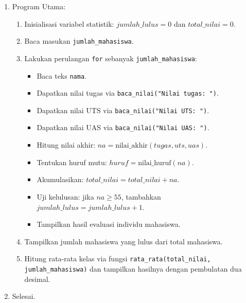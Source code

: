 \documentclass[12pt,a4paper]{article}
\begin{document}
\begin{enumerate}
\begin{enumerate}[label=\alph*.]
\begin{itemize}
            \item \texttt{rata\_rata(total, banyak)}: jika $banyak == 0$ kembalikan 0, selain itu kembalikan $total / banyak$.
        \end{itemize}
        \item Program Utama:
        \begin{enumerate}[label=\roman*.]
            \item Inisialisasi variabel statistik: $jumlah\_lulus = 0$ dan $total\_nilai = 0$.
            \item Baca masukan \texttt{jumlah\_mahasiswa}.
            \item Lakukan perulangan \texttt{for} sebanyak \texttt{jumlah\_mahasiswa}:
            \begin{itemize}
                \item Baca teks \texttt{nama}.
                \item Dapatkan nilai tugas via \texttt{baca\_nilai("Nilai tugas: ")}.
                \item Dapatkan nilai UTS via \texttt{baca\_nilai("Nilai UTS: ")}.
                \item Dapatkan nilai UAS via \texttt{baca\_nilai("Nilai UAS: ")}.
                \item Hitung nilai akhir: $na = \text{nilai\_akhir}(tugas, uts, uas)$.
                \item Tentukan huruf mutu: $huruf = \text{nilai\_huruf}(na)$.
                \item Akumulasikan: $total\_nilai = total\_nilai + na$.
                \item Uji kelulusan: jika $na \ge 55$, tambahkan $jumlah\_lulus = jumlah\_lulus + 1$.
                \item Tampilkan hasil evaluasi individu mahasiswa.
            \end{itemize}
            \item Tampilkan jumlah mahasiswa yang lulus dari total mahasiswa.
            \item Hitung rata-rata kelas via fungsi \texttt{rata\_rata(total\_nilai, jumlah\_mahasiswa)} dan tampilkan hasilnya dengan pembulatan dua desimal.
        \end{enumerate}
        \item Selesai.
    \end{enumerate}
\end{enumerate}

\end{document}
